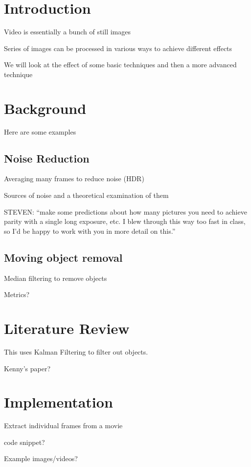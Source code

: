 \section{Introduction}
Video is essentially a bunch of still images

Series of images can be processed in various ways to achieve different effects

We will look at the effect of some basic techniques and then a more advanced technique

\section{Background}
Here are some examples

\subsection{Noise Reduction}
Averaging many frames to reduce noise (HDR)

Sources of noise and a theoretical examination of them

STEVEN: ``make some predictions about how many pictures you need to achieve parity with a single long
exposure, etc. I blew through this way too fast in class, so I'd be happy to work with you in more
detail on this.''

\subsection{Moving object removal}
Median filtering to remove objects

Metrics?

\section{Literature Review}
This uses Kalman Filtering to filter out objects\cite{moving_object_removal}.

Kenny's paper?

\section{Implementation}
Extract individual frames from a movie

code snippet?

Example images/videos?
